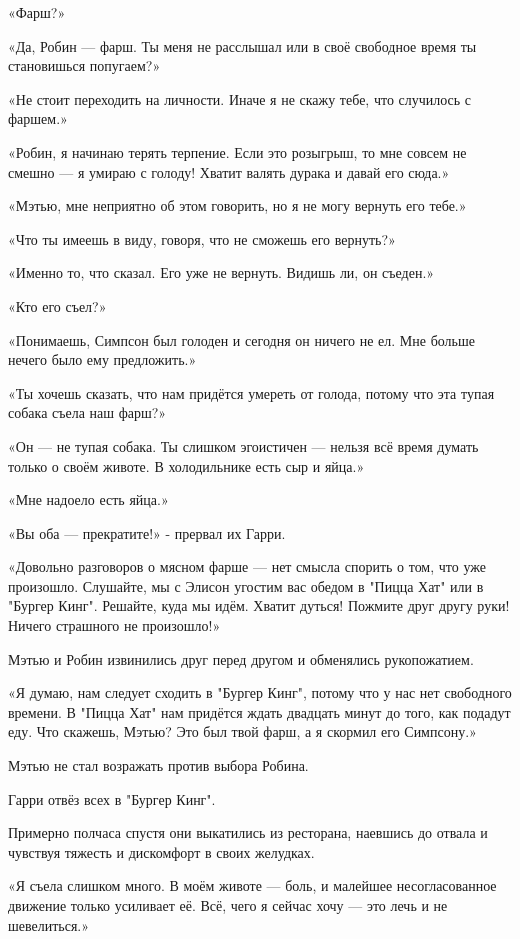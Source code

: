 \documentclass[a5paper, 9pt,
final, openany, twoside=true]{memoir}
\begin{document}
«Фарш?»

«Да, Робин — фарш. Ты меня не расслышал или в своё свободное время ты становишься попугаем?»

«Не стоит переходить на личности. Иначе я не скажу тебе, что случилось с фаршем.»

«Робин, я начинаю терять терпение. Если это розыгрыш, то мне совсем не смешно — я умираю с голоду! Хватит валять дурака и давай его сюда.»

«Мэтью, мне неприятно об этом говорить, но я не могу вернуть его тебе.»

«Что ты имеешь в виду, говоря, что не сможешь его вернуть?»

«Именно то, что сказал. Его уже не вернуть. Видишь ли, он съеден.»

«Кто его съел?»

«Понимаешь, Симпсон был голоден и сегодня он ничего не ел. Мне больше нечего было ему предложить.»

«Ты хочешь сказать, что нам придётся умереть от голода, потому что эта тупая собака съела наш фарш?»

«Он — не тупая собака. Ты слишком эгоистичен — нельзя всё время думать только о своём животе. В холодильнике есть сыр и яйца.»

«Мне надоело есть яйца.»

«Вы оба — прекратите!» - прервал их Гарри.

«Довольно разговоров о мясном фарше — нет смысла спорить о том, что уже произошло. Слушайте, мы с Элисон угостим вас обедом в "Пицца Хат" или в "Бургер Кинг". Решайте, куда мы идём. Хватит дуться! Пожмите друг другу руки! Ничего страшного не произошло!»

Мэтью и Робин извинились друг перед другом и обменялись рукопожатием.

«Я думаю, нам следует сходить в "Бургер Кинг", потому что у нас нет свободного времени. В "Пицца Хат" нам придётся ждать двадцать минут до того, как подадут еду. Что скажешь, Мэтью? Это был твой фарш, а я скормил его Симпсону.»

Мэтью не стал возражать против выбора Робина.

Гарри отвёз всех в "Бургер Кинг".\bigskip

Примерно полчаса спустя они выкатились из ресторана, наевшись до отвала и чувствуя тяжесть и дискомфорт в своих желудках.

«Я съела слишком много. В моём животе — боль, и малейшее несогласованное движение только усиливает её. Всё, чего я сейчас хочу — это лечь и не шевелиться.»
\end{document}
